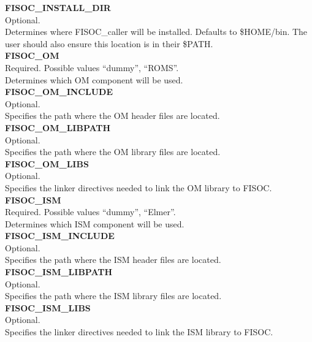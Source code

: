 \documentclass[12pt]{article}
\begin{document}
\begin{flushleft}
\textbf{FISOC\_INSTALL\_DIR}                       \\ 
Optional.                                          \\
Determines where FISOC\_caller will be installed. Defaults to \$HOME/bin. 
The user should also ensure this location is in their \$PATH. \\
\vspace{6pt}
\textbf{FISOC\_OM}                                 \\ 
Required. Possible values ``dummy'', ``ROMS''.     \\
Determines which OM component will be used.        \\
\vspace{6pt}
\textbf{FISOC\_OM\_INCLUDE}                       \\ 
Optional.                                          \\
Specifies the path where the OM header files are located.\\
\vspace{6pt}
\textbf{FISOC\_OM\_LIBPATH}                       \\
Optional.                                          \\
Specifies the path where the OM library files are located.\\
\vspace{6pt}
\textbf{FISOC\_OM\_LIBS}                          \\
Optional.                                          \\
Specifies the linker directives needed to link the OM library to FISOC. \\
\vspace{6pt}
\textbf{FISOC\_ISM}                                \\
Required. Possible values ``dummy'', ``Elmer''.    \\
Determines which ISM component will be used.       \\
\vspace{6pt}
\textbf{FISOC\_ISM\_INCLUDE}                       \\ 
Optional.                                          \\
Specifies the path where the ISM header files are located.\\
\vspace{6pt}
\textbf{FISOC\_ISM\_LIBPATH}                       \\
Optional.                                          \\
Specifies the path where the ISM library files are located.\\
\vspace{6pt}
\textbf{FISOC\_ISM\_LIBS}                          \\
Optional.                                          \\
Specifies the linker directives needed to link the ISM library to FISOC. \\
\end{flushleft}
\end{document}
